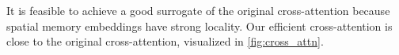 It is feasible to achieve a good surrogate of the original cross-attention because spatial memory embeddings have strong locality. 
Our efficient cross-attention is close to the original cross-attention, visualized in \cref{fig:cross_attn}. 









